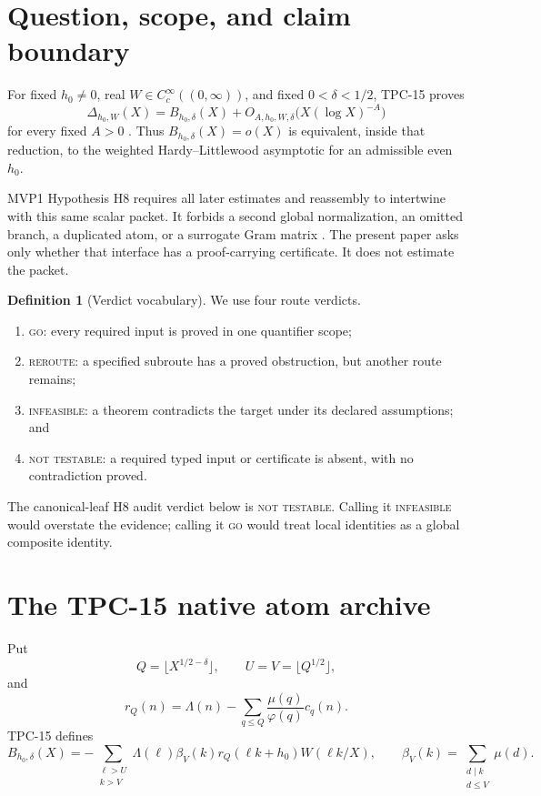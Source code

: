 \documentclass[11pt,a4paper]{article}
\theoremstyle{definition}
\newtheorem{definition}[theorem]{Definition}
\theoremstyle{remark}
\begin{document}
\section{Question, scope, and claim boundary}

For fixed \(h_0\ne0\), real
\(W\in C_c^\infty((0,\infty))\), and fixed
\(0<\delta<1/2\), TPC-15 proves
\begin{equation}
 \Delta_{h_0,W}(X)
 =
 B_{h_0,\delta}(X)
 +O_{A,h_0,W,\delta}\bigl(X(\log X)^{-A}\bigr)
 \label{eq:anchor}
\end{equation}
for every fixed \(A>0\) \citep{WangTPC15}.  Thus
\(B_{h_0,\delta}(X)=o(X)\) is equivalent, inside that reduction, to
the weighted Hardy--Littlewood asymptotic for an admissible even
\(h_0\).

MVP1 Hypothesis H8 requires all later estimates and reassembly to
intertwine with this same scalar packet.  It forbids a second global
normalization, an omitted branch, a duplicated atom, or a surrogate
Gram matrix \citep{WangMVP1}.  The present paper asks only whether that
interface has a proof-carrying certificate.  It does not estimate the
packet.

\begin{definition}[Verdict vocabulary]
We use four route verdicts.
\begin{enumerate}[label=(\roman*),leftmargin=2.2em]
\item \textsc{go}: every required input is proved in one quantifier
scope;
\item \textsc{reroute}: a specified subroute has a proved obstruction,
but another route remains;
\item \textsc{infeasible}: a theorem contradicts the target under its
declared assumptions; and
\item \textsc{not testable}: a required typed input or certificate is
absent, with no contradiction proved.
\end{enumerate}
\end{definition}

The canonical-leaf H8 audit verdict below is \textsc{not testable}.  Calling it
\textsc{infeasible} would overstate the evidence; calling it
\textsc{go} would treat local identities as a global composite
identity.

\section{The TPC-15 native atom archive}

Put
\[
 Q=\lfloor X^{1/2-\delta}\rfloor,\qquad
 U=V=\lfloor Q^{1/2}\rfloor,
\]
and
\[
 r_Q(n)=\Lambda(n)-
 \sum_{q\le Q}\frac{\mu(q)}{\varphi(q)}c_q(n).
\]
TPC-15 defines
\begin{equation}
 B_{h_0,\delta}(X)
 =
 -\sum_{\substack{\ell>U\\k>V}}
 \Lambda(\ell)\beta_V(k)r_Q(\ell k+h_0)W(\ell k/X),
 \qquad
 \beta_V(k)=\sum_{\substack{d\mid k\\d\le V}}\mu(d).
 \label{eq:tpc15-packet}
\end{equation}
\end{document}

